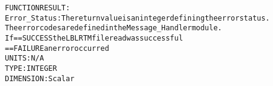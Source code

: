 \begin{alltt}
  FUNCTION RESULT:
        Error_Status:  The return value is an integer defining the error status.
                       The error codes are defined in the Message_Handler module.
                       If == SUCCESS the LBLRTM file read was successful
                          == FAILURE an error occurred
                       UNITS:      N/A
                       TYPE:       INTEGER
                       DIMENSION:  Scalar
 
  \end{alltt}
